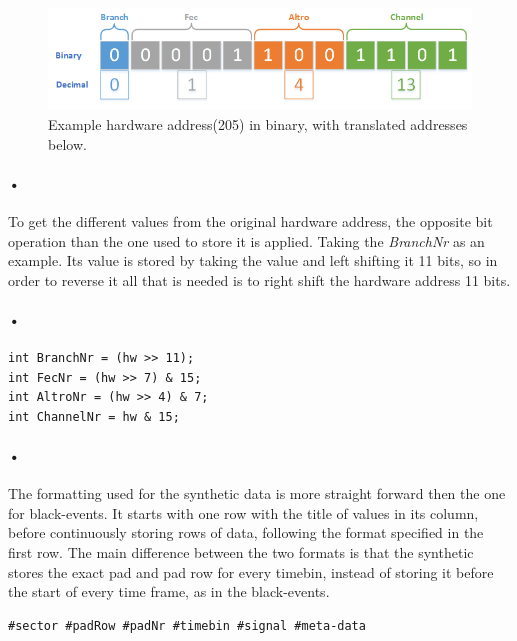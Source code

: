 \documentclass[a4paper, 12pt]{report}
\begin{document}
\begin{figure}[h!]
	\centering
		\includegraphics[width=1.0\textwidth]{images/hw-binary.png}
		\caption{Example hardware address(205) in binary, with translated addresses below.}
		\label{fig:hw-binary}
\end{figure}

\paragraph{•}
To get the different values from the original hardware address, the opposite bit operation than the one used to store it is applied.
Taking the \textit{BranchNr} as an example.
Its value is stored by taking the value and left shifting it 11 bits, so in order to reverse it all that is needed is to right shift the hardware address 11 bits.
\paragraph{•}
\begin{minipage}{\linewidth}
\begin{lstlisting}[caption=Bitwise operation to retrieve values from the hardware address., label=lst:bit-operation]
int BranchNr = (hw >> 11);
int FecNr = (hw >> 7) & 15;
int AltroNr = (hw >> 4) & 7;
int ChannelNr = hw & 15;
\end{lstlisting}
\end{minipage}

\paragraph{•}
The formatting used for the synthetic data is more straight forward then the one for black-events.
It starts with one row with the title of values in its column, before continuously storing rows of data, following the format specified in the first row.
The main difference between the two formats is that the synthetic stores the exact pad and pad row for every timebin, instead of storing it before the start of every time frame, as in the black-events.

\begin{lstlisting}[caption=Format for the synthetic dataset., label=lst:synthetic-data-format]
#sector #padRow #padNr #timebin #signal #meta-data
\end{lstlisting}
\end{document}
